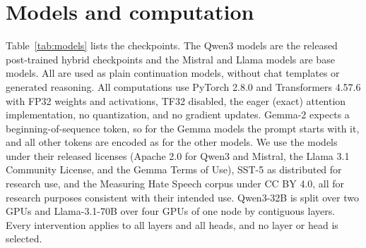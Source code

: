 
\section{Models and computation}
\label{app:models}

Table~\ref{tab:models} lists the checkpoints.
The Qwen3 models are the released post-trained hybrid checkpoints and the Mistral and Llama models are base models. All are used as plain continuation models, without chat templates or generated reasoning.
All computations use PyTorch 2.8.0 and Transformers 4.57.6 with FP32 weights and activations, TF32 disabled, the eager (exact) attention implementation, no quantization, and no gradient updates.
Gemma-2 expects a beginning-of-sequence token, so for the Gemma models the prompt starts with it, and all other tokens are encoded as for the other models.
We use the models under their released licenses (Apache 2.0 for Qwen3 and Mistral, the Llama 3.1 Community License, and the Gemma Terms of Use), SST-5 as distributed for research use, and the Measuring Hate Speech corpus under CC BY 4.0, all for research purposes consistent with their intended use.
Qwen3-32B is split over two GPUs and Llama-3.1-70B over four GPUs of one node by contiguous layers.
Every intervention applies to all layers and all heads, and no layer or head is selected.

\begin{table}[!ht]
\centering\small
\setlength{\tabcolsep}{3pt}
\caption{Model checkpoints (Hugging Face revisions, first eight characters).
$^\dagger$Loaded from the public mirror \texttt{NousResearch/Meta-Llama-3.1-70B}, whose 30 weight shards are byte-identical to this official revision.}
\label{tab:models}
\end{table}

